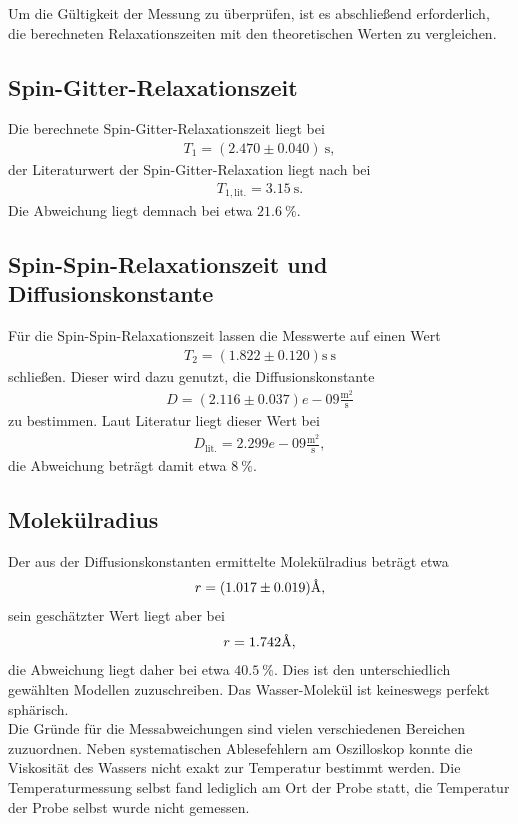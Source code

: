 \noindent Um die Gültigkeit der Messung zu überprüfen, ist es abschließend
erforderlich, die berechneten Relaxationszeiten mit den theoretischen Werten
zu vergleichen.
\subsection{Spin-Gitter-Relaxationszeit}
Die berechnete Spin-Gitter-Relaxationszeit liegt bei
\begin{align*}
  T_1 =  (2.470  \pm  0.040) \: \si{\second},
\end{align*}
\noindent der Literaturwert der Spin-Gitter-Relaxation liegt nach
\cite{temperatur_t1} bei
\begin{align*}
  T_{1,\text{lit.}} = 3.15 \: \si{\second}.
\end{align*}
\noindent Die Abweichung liegt demnach bei etwa $\SI{21.6}{\percent}$.
\subsection{Spin-Spin-Relaxationszeit und Diffusionskonstante}
\noindent Für die Spin-Spin-Relaxationszeit lassen die Messwerte auf einen Wert
\begin{align*}
  T_2 =  (1.822  \pm  0.120) \si{\second} \: \si{\second}
\end{align*}
\noindent schließen. Dieser wird dazu genutzt, die Diffusionskonstante
\begin{align*}
  D =  (2.116 \pm 0.037)e-09 \frac{\si{\meter^2}}{\si{\second}}
\end{align*}
\noindent zu bestimmen. Laut Literatur \cite{diffusion} liegt dieser Wert bei
\begin{align*}
  D_\text{lit.} =  2.299e-09  \frac{\si{\meter^2}}{\si{\second}},
\end{align*}
\noindent die Abweichung beträgt damit etwa $\SI{8}{\percent}$.
\subsection{Molekülradius}
Der aus der Diffusionskonstanten ermittelte Molekülradius beträgt etwa
\begin{align*}
 r = (1.017\pm 0.019) \text{\r{A}},
\end{align*}
\noindent sein geschätzter Wert liegt aber bei
\begin{align*}
 r = 1.742 \text{\r{A}},
\end{align*}
\noindent die Abweichung liegt daher bei etwa $\SI{40.5}{\percent}$. Dies ist den unterschiedlich gewählten Modellen zuzuschreiben. Das Wasser-Molekül ist keineswegs perfekt sphärisch. \\
\noindent Die Gründe für die Messabweichungen sind vielen verschiedenen
Bereichen zuzuordnen. Neben systematischen Ablesefehlern am Oszilloskop konnte
die Viskosität des Wassers nicht exakt zur Temperatur bestimmt werden. Die
Temperaturmessung selbst fand lediglich am Ort der Probe statt, die Temperatur
der Probe selbst wurde nicht gemessen.
